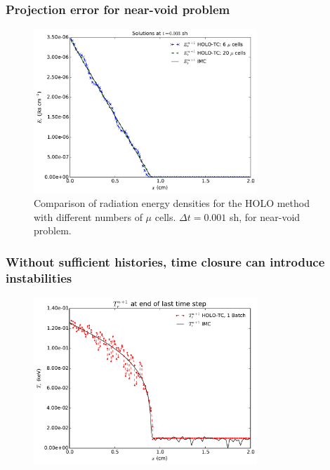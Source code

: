 \documentclass[xcolor=dvipsnames,hyperref={pdfpagelabels=false},unknownkeysallowed]{beamer}
\begin{document}
\begin{frame}
    \frametitle{Projection error for near-void problem}
\begin{figure}[H]
  \centering
    \includegraphics[width=0.75\textwidth]{void_ang_compare.pdf}
    \caption{\label{fig:bumps} Comparison of radiation energy densities for
    the HOLO method with different numbers of $\mu$ cells. $\Delta t=0.001$ sh, for
near-void problem.}
\end{figure}
\end{frame}

\begin{frame}
    \frametitle{Without sufficient histories, time closure can introduce instabilities}
\begin{figure}
    \centering
    \includegraphics[width=0.75\textwidth]{thin_30k_fails.pdf}
\end{figure}
\end{frame}
\end{document}
